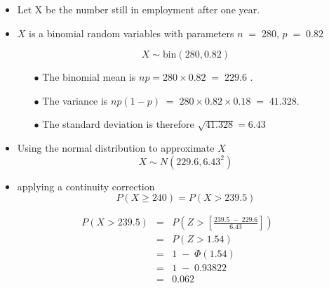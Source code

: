 \documentclass[a4paper,12pt]{article}
\begin{document}
\medskip 
\begin{itemize}
\item Let X be the number still in employment after one year.

\item $X$ is a binomial random variables with parameters $n \;=\; 280$, $p \;=\;0.82$ 

\[X \sim  \mbox{bin} (280, 0.82) \]
\begin{itemize}
\item[$\bullet$] The binomial mean is $np= 280 \times 0.82 \;=\; 229.6$ .
\item[$\bullet$] The  variance is $np(1-p) \;=\;280 \times 0.82 \times 0.18 \;=\; 41.328$.
\item[$\bullet$] The standard deviation is therefore $\sqrt{41.328} = 6.43$
\end{itemize}

\item Using the normal distribution to approximate $X$
\[X \sim N (229.6, 6.43^2 )\]


\item  applying a continuity correction
\[P ( X \geq 240) = P ( X > 239.5)\]
\end{itemize}

\begin{eqnarray*}
P ( X > 239.5) &=& P\left(Z > \left[ \frac{239.5 \;-\; 229.6}{6.43} \right] \right) \\
&=&  P ( Z > 1.54) \\ 
&=&  1 \;-\; \Phi(1.54) \\
&=& 1 \;-\; 0.93822 \\
&=& 0.062 \\
\end{eqnarray*}
\end{document}
